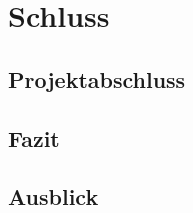\chapter{Schluss}\label{chpt:schluss}

\section{Projektabschluss}\label{sec:projektschluss}

\section{Fazit}\label{sec:fazit}

\section{Ausblick}\label{sec:Ausblick}